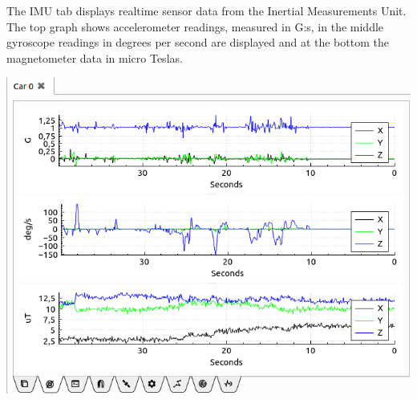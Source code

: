 \documentclass[12pt]{article} %
\begin{document}
\noindent\begin{minipage}{0.5\textwidth} %

 The IMU tab displays realtime sensor data from the Inertial
Measurements Unit. The top graph shows accelerometer readings,
measured in G:s, in the middle gyroscope readings in degrees per
second are displayed and at the bottom the magnetometer data in micro
Teslas.

\end{minipage}
\begin{minipage}{0.5\textwidth}
      \noindent \includegraphics[width=\textwidth]{./screens/Car_IMU_realtime.png}
\end{minipage}

\end{document}

